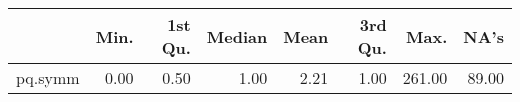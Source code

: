 \begin{table}[ht]
\centering
\begin{tabular}{rrrrrrrr}
  \hline
 & Min. & 1st Qu. & Median & Mean & 3rd Qu. & Max. & NA's \\ 
  \hline
pq.symm & 0.00 & 0.50 & 1.00 & 2.21 & 1.00 & 261.00 & 89.00 \\ 
   \hline
\end{tabular}
\end{table}
